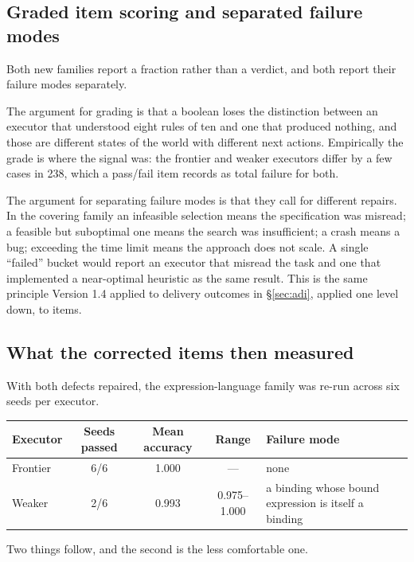 \documentclass[11pt]{article}
\theoremstyle{definition}
\begin{document}
\subsection{Graded item scoring and separated failure modes}\label{sec:graded}

Both new families report a fraction rather than a verdict, and both report their failure modes separately.

The argument for grading is that a boolean loses the distinction between an executor that understood eight rules of ten and one that produced nothing, and those are different states of the world with different next actions. Empirically the grade is where the signal was: the frontier and weaker executors differ by a few cases in 238, which a pass/fail item records as total failure for both.

The argument for separating failure modes is that they call for different repairs. In the covering family an infeasible selection means the specification was misread; a feasible but suboptimal one means the search was insufficient; a crash means a bug; exceeding the time limit means the approach does not scale. A single ``failed'' bucket would report an executor that misread the task and one that implemented a near-optimal heuristic as the same result. This is the same principle Version 1.4 applied to delivery outcomes in \S\ref{sec:adi}, applied one level down, to items.

\subsection{What the corrected items then measured}\label{sec:corrected}

With both defects repaired, the expression-language family was re-run across six seeds per executor.

\begin{table}[h]
\centering\small
\begin{tabularx}{\textwidth}{@{}lcccY@{}}
\toprule
Executor & Seeds passed & Mean accuracy & Range & Failure mode \\
\midrule
Frontier & 6/6 & 1.000 & --- & none \\
Weaker & 2/6 & 0.993 & 0.975--1.000 & a binding whose bound expression is itself a binding \\
\bottomrule
\end{tabularx}
\end{table}

Two things follow, and the second is the less comfortable one.
\end{document}
